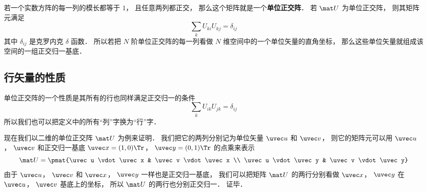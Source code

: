 

若一个实数方阵的每一列的模长都等于 $1$， 且任意两列都正交， 那么这个矩阵就是一个\textbf{单位正交阵}． 若 $\mat U$ 为单位正交阵， 则其矩阵元满足
\begin{equation}
\sum_k U_{ki} U_{kj} = \delta_{ij}
\end{equation}
其中 $\delta_{ij}$ 是克罗内克 $\delta$ 函数． 所以若把 $N$ 阶单位正交阵的每一列看做 $N$ 维空间中的一个单位矢量的直角坐标， 那么这些单位矢量就组成该空间的一组正交归一基底．

\subsection{行矢量的性质}
单位正交阵的一个性质是其所有的行也同样满足正交归一的条件
\begin{equation}
\sum_k U_{ik} U_{jk} = \delta_{ij}
\end{equation}
所以我们也可以把定义中的所有“列”字换为“行”字．

现在我们以二维的单位正交阵 $\mat U$ 为例来证明． 我们把它的两列分别记为单位矢量 $\uvec u$ 和 $\uvec v$， 则它的矩阵元可以用 $\uvec u$， $\uvec v$ 和正交归一基底 $\uvec x = (1, 0)\Tr$， $\uvec y = (0, 1)\Tr$ 的点乘来表示
\begin{equation}\label{UOrM_eq3}
\mat U = \pmat{\uvec u \vdot \uvec x & \uvec v \vdot \uvec x \\
\uvec u \vdot \uvec y & \uvec v \vdot \uvec y}
\end{equation}
由于 $\uvec u$， $\uvec v$ 和 $\uvec x$， $\uvec y$ 一样也是正交归一基底， 我们可以把矩阵 $\mat U$ 的两行分别看做 $\uvec x$， $\uvec y$ 在 $\uvec u$， $\uvec v$ 基底上的坐标， 所以 $\mat U$ 的两行也分别正交归一． 证毕．

